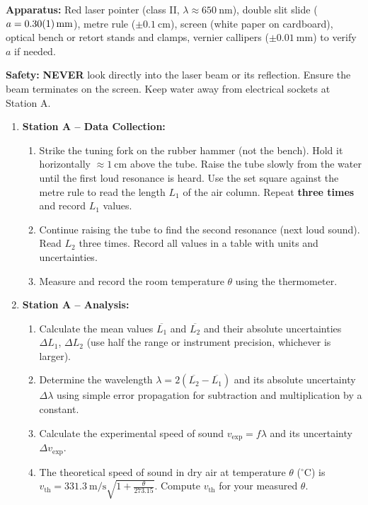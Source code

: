 \documentclass[11pt]{article}
\newcounter{popsec}
\newcounter{popsub}
\newcommand{\courssub}[1]{%
  \stepcounter{popsub}%
  \par\vspace{9pt}\noindent{\popxbold\fontsize{11.5}{13}\selectfont\color{popink}{\color{poporange}\thepopsec.\thepopsub}\hspace{6pt}#1}\par\nopagebreak\vspace{4pt}
}
\begin{document}
\textbf{Apparatus:} Red laser pointer (class II, $\lambda \approx \SI{650}{\nano\metre}$), double slit slide ($a = \SI{0.30 \pm 0.01}{\milli\metre}$), metre rule ($\pm \SI{0.1}{\centi\metre}$), screen (white paper on cardboard), optical bench or retort stands and clamps, vernier callipers ($\pm \SI{0.01}{\milli\metre}$) to verify $a$ if needed.

\textbf{Safety:} \textbf{NEVER} look directly into the laser beam or its reflection. Ensure the beam terminates on the screen. Keep water away from electrical sockets at Station A.

\courssub{Tasks}
\begin{enumerate}
    \item \textbf{Station A -- Data Collection:} 
    \begin{enumerate}
        \item Strike the tuning fork on the rubber hammer (not the bench). Hold it horizontally $\approx \SI{1}{\centi\metre}$ above the tube. Raise the tube slowly from the water until the first loud resonance is heard. Use the set square against the metre rule to read the length $L_1$ of the air column. Repeat \textbf{three times} and record $L_1$ values.
        \item Continue raising the tube to find the second resonance (next loud sound). Read $L_2$ three times. Record all values in a table with units and uncertainties.
        \item Measure and record the room temperature $\theta$ using the thermometer.
    \end{enumerate}
    \item \textbf{Station A -- Analysis:} 
    \begin{enumerate}
        \item Calculate the mean values $\overline{L_1}$ and $\overline{L_2}$ and their absolute uncertainties $\Delta L_1$, $\Delta L_2$ (use half the range or instrument precision, whichever is larger).
        \item Determine the wavelength $\lambda = 2(\overline{L_2} - \overline{L_1})$ and its absolute uncertainty $\Delta \lambda$ using simple error propagation for subtraction and multiplication by a constant.
        \item Calculate the experimental speed of sound $v_{\text{exp}} = f\lambda$ and its uncertainty $\Delta v_{\text{exp}}$.
        \item The theoretical speed of sound in dry air at temperature $\theta$ ($^\circ\mathrm{C}$) is $v_{\text{th}} = \SI{331.3}{\metre\per\second} \sqrt{1 + \frac{\theta}{273.15}}$. Compute $v_{\text{th}}$ for your measured $\theta$.

\end{enumerate}
\end{enumerate}
\end{document}
